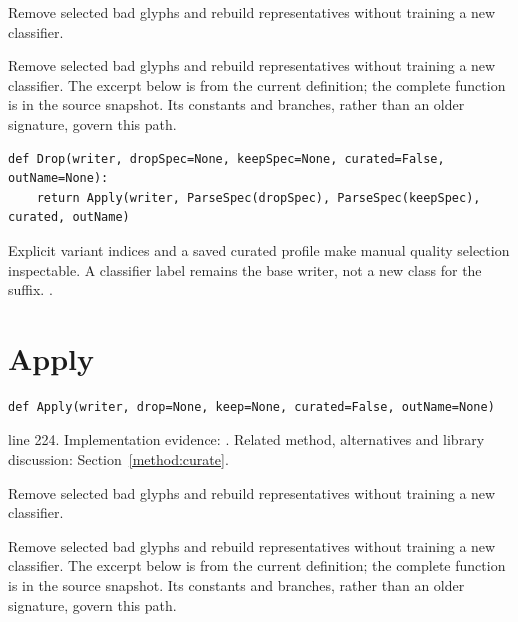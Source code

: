 Remove selected bad glyphs and rebuild representatives without training a new classifier.


Remove selected bad glyphs and rebuild representatives without training a new classifier. The excerpt below is from the current definition; the complete function is in the source snapshot. Its constants and branches, rather than an older signature, govern this path.


\begin{lstlisting}[style=plain]
def Drop(writer, dropSpec=None, keepSpec=None, curated=False, outName=None):
    return Apply(writer, ParseSpec(dropSpec), ParseSpec(keepSpec), curated, outName)
\end{lstlisting}
Explicit variant indices and a saved curated profile make manual quality selection inspectable. A classifier label remains the base writer, not a new class for the suffix. \cite{code2026,haines2016,pillowdraw}.


\section{Apply}\label{fn:curate:Apply}
\begin{lstlisting}[style=sig]
def Apply(writer, drop=None, keep=None, curated=False, outName=None)
\end{lstlisting}
 line 224. Implementation evidence: \cite{code2026}. Related method, alternatives and library discussion: Section~\ref{method:curate}.


Remove selected bad glyphs and rebuild representatives without training a new classifier.


Remove selected bad glyphs and rebuild representatives without training a new classifier. The excerpt below is from the current definition; the complete function is in the source snapshot. Its constants and branches, rather than an older signature, govern this path.


